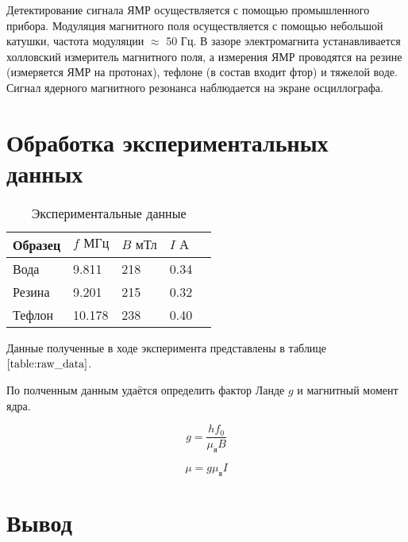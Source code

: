 \documentclass[a4paper, 14pt]{article}
\begin{document}
Детектирование сигнала ЯМР осуществляется с помощью промышленного прибора. Модуляция магнитного поля осуществляется с помощью небольшой катушки, частота модуляции $\approx$ 50 Гц. В зазоре электромагнита устанавливается холловский измеритель магнитного поля, а измерения ЯМР проводятся на резине (измеряется ЯМР на протонах), тефлоне (в состав входит фтор) и тяжелой воде.\\
Сигнал ядерного магнитного резонанса наблюдается на экране осциллографа.




\section*{\textcolor{header}{Обработка экспериментальных данных}}


\begin{table}[hbtp]
    \begin{center}
    
    \begin{tabular}{|l|l|l|l|l|}
    \hline
    Образец & $f \text{ МГц}$ & $B \text{ мТл}$ & $I \text{ А}$   \\ \hline
    Вода    & 9.811           & 218             & 0.34            \\ \hline
    Резина  & 9.201           & 215             & 0.32            \\ \hline
    Тефлон  & 10.178          & 238             & 0.40            \\ \hline
    \end{tabular}
    \caption{Экспериментальные данные}
    \label{table:raw_data}
\end{center}
\end{table}
Данные полученные в ходе эксперимента представлены в таблице $\ref{table:raw_data}$.

По полченным данным удаётся определить фактор Ланде $g$ и магнитный момент ядра.

\begin{equation}
    g = \frac{h f_{0}}{\mu_{\text{я}} B}
\end{equation}



\begin{equation}
    \mu = g  \mu_{\text{я}} I
\end{equation}


\section*{\textcolor{header}{Вывод}}
\end{document}
